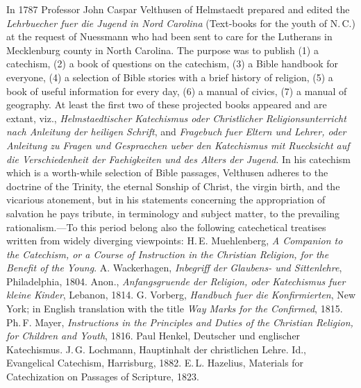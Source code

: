 In 1787 Professor John Caspar Velthusen of Helmstaedt prepared and edited the \emph{Lehrbuecher fuer die Jugend in Nord Carolina} (Text-books for the youth of N.\,C.) at the request of Nuessmann who had been sent to care for the Lutherans in Mecklenburg county in North Carolina. The purpose was to publish (1) a catechism, (2) a book of questions on the catechism, (3) a Bible handbook for everyone, (4) a selection of Bible stories with a brief history of religion, (5) a
book of useful information for every day, (6) a manual of civics, (7) a manual of geography. At least the first two of these projected books appeared and are extant, viz., \emph{Helmstaedtischer Katechismus oder Christlicher Religionsunterricht nach Anleitung der heiligen Schrift}, and \emph{Fragebuch fuer Eltern und Lehrer, oder Anleitung zu Fragen und Gespraechen ueber den Katechismus mit Ruecksicht auf die Verschiedenheit der Faehigkeiten und des Alters der Jugend}. In his catechism which is a worth-while selection of Bible passages, Velthusen adheres to the doctrine of the Trinity, the eternal Sonship of Christ, the virgin birth, and the vicarious atonement, but in his statements concerning the appropriation of salvation he pays tribute, in terminology and subject matter, to the prevailing rationalism.—To this period belong also the following catechetical treatises written from widely diverging viewpoints: H.\,E. Muehlenberg, \emph{A Companion to the Catechism, or a Course of Instruction in the Christian Religion, for the Benefit of the Young}. A. Wackerhagen, \emph{Inbegriff der Glaubens- und Sittenlehre}, Philadelphia, 1804. Anon., \emph{Anfangsgruende der Religion, oder Katechismus fuer kleine Kinder}, Lebanon, 1814. G. Vorberg, \emph{Handbuch fuer die Konfirmierten}, New York; in English translation with the title \emph{Way Marks for the Confirmed}, 1815. Ph.\,F. Mayer, \emph{Instructions in the Principles and Duties of the Christian Religion, for Children and Youth}, 1816. Paul Henkel, Deutscher und englischer Katechismus. J.\,G. Lochmann, Hauptinhalt der christlichen Lehre. Id., Evangelical Catechism, Harrisburg, 1882. E.\,L. Hazelius, Materials for Catechization on Passages of Scripture, 1823.

